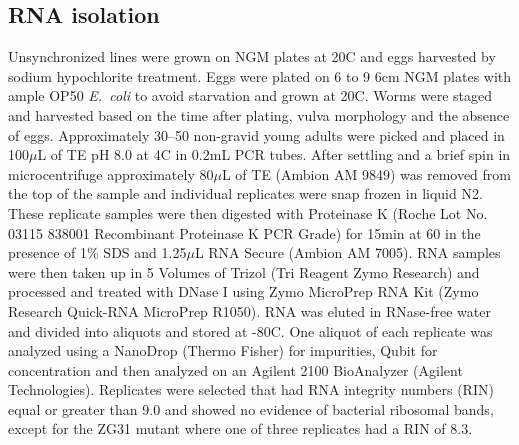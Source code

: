 \documentclass[10pt, onecolumn]{article}
\newcommand{\ecol}{\emph{E.~coli}}
\begin{document}
\subsection*{RNA isolation}
Unsynchronized lines were grown on NGM plates at 20C and eggs harvested by
sodium hypochlorite treatment. Eggs were plated on 6 to 9 6cm NGM plates
with ample OP50 \ecol{} to avoid starvation and grown at
20\degree{}C.  Worms were staged and harvested based on the time after plating,
vulva morphology and the absence of eggs.  Approximately 30--50 non-gravid young
adults were picked and placed in 100$\mu$L of TE pH 8.0 at 4\degree{}C in
$0.2$mL PCR tubes.   After settling and a brief spin in microcentrifuge
approximately $80\mu$L of TE (Ambion AM 9849) was removed from the top of the
sample and individual replicates
were snap frozen in liquid N2. These replicate samples were then digested with
Proteinase K (Roche Lot No. 03115 838001 Recombinant Proteinase K PCR Grade) for
15min at 60\degree{} in the presence of 1\% SDS and 1.25$\mu$L
RNA Secure (Ambion AM 7005). RNA samples were then taken up in 5 Volumes of
Trizol (Tri Reagent Zymo Research) and processed and treated with DNase I using
Zymo MicroPrep RNA Kit (Zymo Research Quick-RNA MicroPrep R1050).
RNA was eluted in RNase-free water and divided into aliquots and stored at
-80\degree{}C. One aliquot of each replicate was analyzed using a NanoDrop (Thermo
Fisher) for impurities, Qubit for concentration and then analyzed on an Agilent
2100 BioAnalyzer (Agilent Technologies).
Replicates were selected that had RNA integrity numbers (RIN) equal or greater
than 9.0 and showed no evidence of bacterial ribosomal bands, except for the
ZG31 mutant where one of three replicates had a RIN of 8.3.
\end{document}
